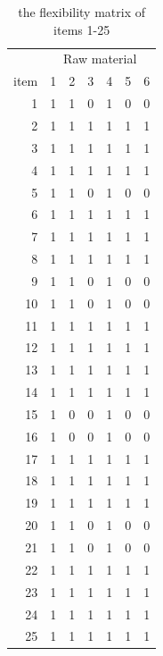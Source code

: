 \documentclass[preprint, 3p,
authoryear]{elsarticle} %
\begin{document}
\begin{table}[!h]

\caption{\label{tab:unnamed-chunk-5}the flexibility matrix of items 1-25}
\centering
\begin{tabular}[t]{r|r|r|r|r|r|r}
\hline
\multicolumn{1}{c|}{ } & \multicolumn{6}{c}{Raw material} \\
\cline{2-7}
item & 1 & 2 & 3 & 4 & 5 & 6\\
\hline
1 & 1 & 1 & 0 & 1 & 0 & 0\\
\hline
2 & 1 & 1 & 1 & 1 & 1 & 1\\
\hline
3 & 1 & 1 & 1 & 1 & 1 & 1\\
\hline
4 & 1 & 1 & 1 & 1 & 1 & 1\\
\hline
5 & 1 & 1 & 0 & 1 & 0 & 0\\
\hline
6 & 1 & 1 & 1 & 1 & 1 & 1\\
\hline
7 & 1 & 1 & 1 & 1 & 1 & 1\\
\hline
8 & 1 & 1 & 1 & 1 & 1 & 1\\
\hline
9 & 1 & 1 & 0 & 1 & 0 & 0\\
\hline
10 & 1 & 1 & 0 & 1 & 0 & 0\\
\hline
11 & 1 & 1 & 1 & 1 & 1 & 1\\
\hline
12 & 1 & 1 & 1 & 1 & 1 & 1\\
\hline
13 & 1 & 1 & 1 & 1 & 1 & 1\\
\hline
14 & 1 & 1 & 1 & 1 & 1 & 1\\
\hline
15 & 1 & 0 & 0 & 1 & 0 & 0\\
\hline
16 & 1 & 0 & 0 & 1 & 0 & 0\\
\hline
17 & 1 & 1 & 1 & 1 & 1 & 1\\
\hline
18 & 1 & 1 & 1 & 1 & 1 & 1\\
\hline
19 & 1 & 1 & 1 & 1 & 1 & 1\\
\hline
20 & 1 & 1 & 0 & 1 & 0 & 0\\
\hline
21 & 1 & 1 & 0 & 1 & 0 & 0\\
\hline
22 & 1 & 1 & 1 & 1 & 1 & 1\\
\hline
23 & 1 & 1 & 1 & 1 & 1 & 1\\
\hline
24 & 1 & 1 & 1 & 1 & 1 & 1\\
\hline
25 & 1 & 1 & 1 & 1 & 1 & 1\\
\hline
\end{tabular}
\end{table}
\pagebreak
\end{document}
